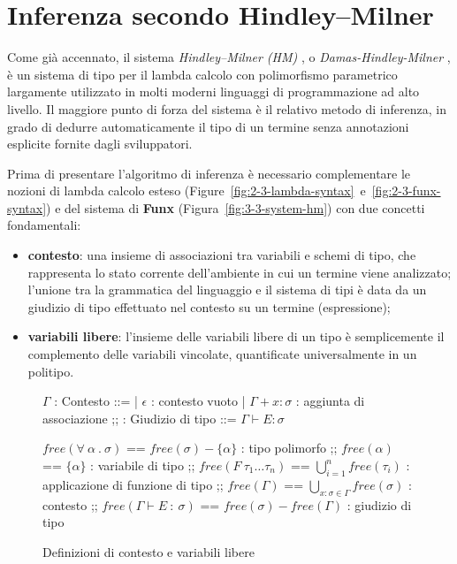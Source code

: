 \section{Inferenza secondo Hindley–Milner}
\label{sec:3-4-hm-type-inference}

Come già accennato, il sistema \textit{Hindley–Milner (HM)} \cite{Hindley-1969-SchemeObject,Milner-1978-TheoryPolymorphism},
o \textit{Damas-Hindley-Milner} \cite{Damas-1982-PrincipalSchemes},
è un sistema di tipo per il lambda calcolo con polimorfismo parametrico largamente utilizzato
in molti moderni linguaggi di programmazione ad alto livello. Il maggiore punto di forza del sistema
è il relativo metodo di inferenza, in grado di dedurre automaticamente il tipo di un termine
senza annotazioni esplicite fornite dagli sviluppatori.


Prima di presentare l'algoritmo di inferenza è necessario complementare le nozioni di lambda calcolo esteso
(Figure~\ref{fig:2-3-lambda-syntax}~e~\ref{fig:2-3-funx-syntax}) e del sistema di \textbf{Funx} (Figura~\ref{fig:3-3-system-hm})
con due concetti fondamentali:
\begin{itemize}
    \item \textbf{contesto}: una insieme di associazioni tra variabili e schemi di tipo,
          che rappresenta lo stato corrente dell'ambiente in cui un termine viene analizzato; l'unione tra la grammatica
          del linguaggio e il sistema di tipi è data da un giudizio di tipo effettuato nel contesto su un termine (espressione);
    \item \textbf{variabili libere}: l'insieme delle variabili libere di un tipo è semplicemente il complemento
          delle variabili vincolate, quantificate universalmente in un politipo.
\end{itemize}

\begin{figure}
    \vspace{4mm}
    \begin{bnf}
        $\Gamma$ : \small{Contesto} ::=
        | $\epsilon$ : \small{contesto vuoto}
        | $\Gamma + x \colon \sigma$ : \small{aggiunta di associazione}
        ;;
        : \small{Giudizio di tipo} ::= $\Gamma \vdash E \colon \sigma$
    \end{bnf}
    \par\vspace{12mm}
    \begin{bnf}
        $free(\forall\ \alpha\ .\ \sigma)$ == $free(\sigma) - \{\alpha\}$ : \small{tipo polimorfo}
        ;;
        $free(\alpha)$ == $\{\alpha\}$ : \small{variabile di tipo}
        ;;
        $free(F\ \tau_1\ldots\tau_n)$ == $\bigcup\limits_{i=1}^{n} free(\tau_i)$ : \small{applicazione di funzione di tipo}
        ;;
        $free(\Gamma)$ == $\bigcup\limits_{x\colon\sigma\in\Gamma} free(\sigma)$ : \small{contesto}
        ;;
        $free(\Gamma\vdash E\ \colon\ \sigma)$ == $free(\sigma) - free(\Gamma)$ : \small{giudizio di tipo}
    \end{bnf}
    \caption{Definizioni di contesto e variabili libere}
    \label{fig:3-4-context-free-variables}
    \vspace{4mm}
\end{figure}

